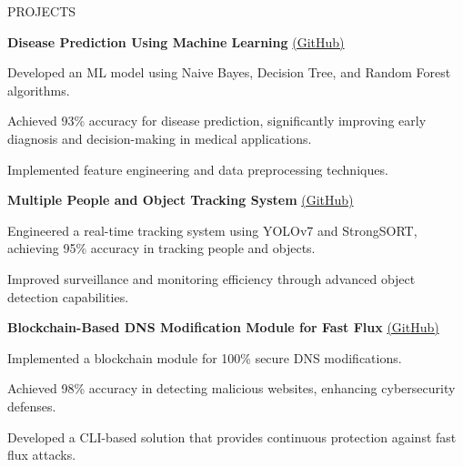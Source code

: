 \documentclass{resume} %
\begin{document}
\vspace{10em}
\begin{rSection}{PROJECTS}
\vspace{-1.25em}
\item \textbf{Disease Prediction Using Machine Learning} \href{https://github.com/Gowthampsych/Mini-project}{(GitHub)}
\begin{itemize}
    \item {Developed an ML model using Naive Bayes, Decision Tree, and Random Forest algorithms.
    \item Achieved 93\% accuracy for disease prediction, significantly improving early diagnosis and decision-making in medical applications.
     \item Implemented feature engineering and data preprocessing techniques.}
\end{itemize}

\item \textbf{Multiple People and Object Tracking System} \href{https://github.com/Gowthampsych/mini_project_2/tree/master}{(GitHub)}
\begin{itemize}
    \item {Engineered a real-time tracking system using YOLOv7 and StrongSORT, achieving 95\% accuracy in tracking people and objects.
    \item Improved surveillance and monitoring efficiency through advanced object detection capabilities.}
\end{itemize}

\item \textbf{Blockchain-Based DNS Modification Module for Fast Flux} \href{https://github.com/Gowthampsych/dns-modification}{(GitHub)}
\begin{itemize}
    \item {Implemented a blockchain module for 100\% secure DNS modifications.
    \item Achieved 98\% accuracy in detecting malicious websites, enhancing cybersecurity defenses.
     \item Developed a CLI-based solution that provides continuous protection against fast flux attacks.}
\end{itemize}
\end{rSection} 

\end{document}
